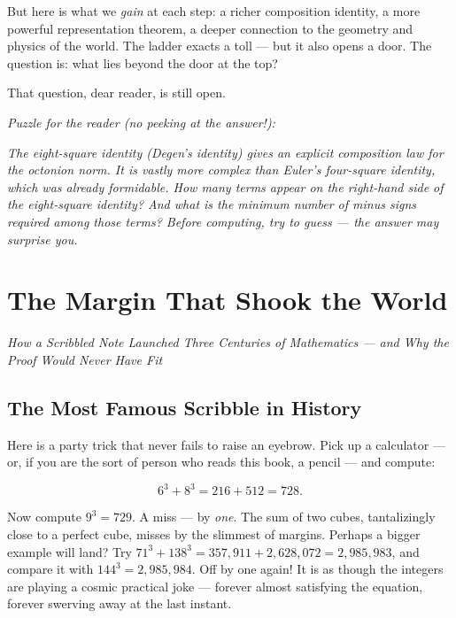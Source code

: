 \documentclass[11pt,openright,twoside]{book}
\renewenvironment{quotation}{%
  \par\vspace{8pt}%
  \begin{list}{}{%
    \setlength{\leftmargin}{2em}%
    \setlength{\rightmargin}{2em}%
  }\item[]\itshape\color{pullquote}%
}{%
  \end{list}%
  \par\vspace{8pt}%
}
\theoremstyle{definition}
\begin{document}
But here is what we \textit{gain} at each step: a richer composition identity, a more powerful representation theorem, a deeper connection to the geometry and physics of the world. The ladder exacts a toll --- but it also opens a door. The question is: what lies beyond the door at the top?

That question, dear reader, is still open.


\bigskip


\textit{Puzzle for the reader (no peeking at the answer!):}

\begin{quotation}
\noindent\itshape \textit{The eight-square identity (Degen's identity) gives an explicit composition law for the octonion norm. It is vastly more complex than Euler's four-square identity, which was already formidable. How many terms appear on the right-hand side of the eight-square identity? And what is the minimum number of minus signs required among those terms? Before computing, try to guess --- the answer may surprise you.}
\end{quotation}

\clearpage


\chapter{The Margin That Shook the World}
\label{ch:10}

\begin{center}
\textit{How a Scribbled Note Launched Three Centuries of Mathematics — and Why the Proof Would Never Have Fit}
\end{center}
\bigskip




\bigskip


\section{The Most Famous Scribble in History}

Here is a party trick that never fails to raise an eyebrow. Pick up a calculator --- or, if you are the sort of person who reads this book, a pencil --- and compute:

\[6^3 + 8^3 = 216 + 512 = 728.\]

Now compute $9^3 = 729$. A miss --- by \textit{one}. The sum of two cubes, tantalizingly close to a perfect cube, misses by the slimmest of margins. Perhaps a bigger example will land? Try $71^3 + 138^3 = 357{,}911 + 2{,}628{,}072 = 2{,}985{,}983$, and compare it with $144^3 = 2{,}985{,}984$. Off by one again! It is as though the integers are playing a cosmic practical joke --- forever almost satisfying the equation, forever swerving away at the last instant.
\end{document}
